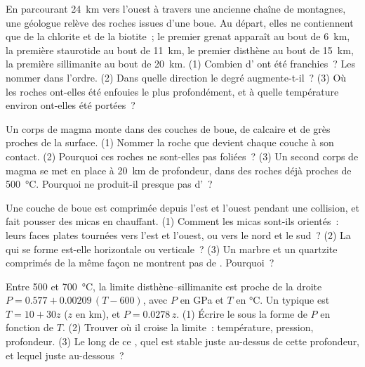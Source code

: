 \begin{exercise}[$\star\star$]\label{exo:g12:metamorphic-rocks:9}
En parcourant \qty{24}{km} vers l'ouest à travers une ancienne chaîne de
montagnes, une géologue relève des roches issues d'une boue. Au départ,
elles ne contiennent que de la chlorite et de la biotite~; le premier grenat
apparaît au bout de \qty{6}{km}, la première staurotide au bout de
\qty{11}{km}, le premier disthène au bout de \qty{15}{km}, la première
sillimanite au bout de \qty{20}{km}. (1) Combien d' ont été
franchies~? Les nommer dans l'ordre. (2) Dans quelle direction le degré
augmente-t-il~? (3) Où les roches ont-elles été enfouies le plus
profondément, et à quelle température environ ont-elles été portées~?
\end{exercise}

\begin{exercise}[$\star\star$]\label{exo:g12:metamorphic-rocks:10}
Un corps de magma monte dans des couches de boue, de calcaire et de grès
proches de la surface. (1) Nommer la roche que devient chaque couche à son
contact. (2) Pourquoi ces roches ne sont-elles pas foliées~? (3) Un second
corps de magma se met en place à \qty{20}{km} de profondeur, dans des
roches déjà proches de \qty{500}{\celsius}. Pourquoi ne produit-il presque
pas d'~?
\end{exercise}

\begin{exercise}[$\star\star$]\label{exo:g12:metamorphic-rocks:11}
Une couche de boue est comprimée depuis l'est et l'ouest pendant une
collision, et fait pousser des micas en chauffant. (1) Comment les micas
sont-ils orientés~: leurs faces plates tournées vers l'est et l'ouest, ou
vers le nord et le sud~? (2) La  qui se forme est-elle
horizontale ou verticale~? (3) Un marbre et un quartzite comprimés de la
même façon ne montrent pas de . Pourquoi~?
\end{exercise}

\begin{exercise}[$\star\star\star$]\label{exo:g12:metamorphic-rocks:12}
Entre 500 et \qty{700}{\celsius}, la limite disthène--sillimanite est proche
de la droite $P = 0.577 + 0.00209\,(T - 600)$, avec $P$ en \unit{GPa} et $T$
en \unit{\celsius}. Un  typique est $T = 10 + 30z$ ($z$ en
\unit{km}), et $P = 0.0278\,z$. (1) Écrire le  sous la forme de
$P$ en fonction de $T$. (2) Trouver où il croise la limite~: température,
pression, profondeur. (3) Le long de ce , quel  est
stable juste au-dessus de cette profondeur, et lequel juste au-dessous~?
\end{exercise}

